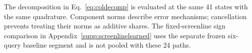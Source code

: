 The decomposition in Eq.~\eqref{eq:coldecomp} is evaluated at the same 41 states
with the same quadrature. Component norms describe error mechanisms; cancellation
prevents treating their norms as additive shares. The fixed-screenline sign
comparison in Appendix~\ref{supp:screenlinelearned} uses the separate frozen
six-query baseline segment and is not pooled with these 24 paths.




